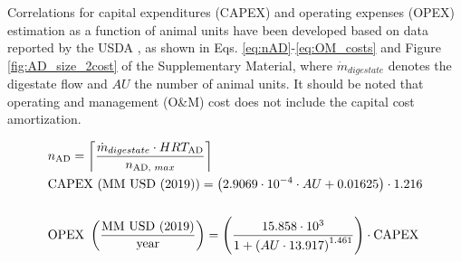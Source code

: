 \begin{refsection}[referencesCh6]
Correlations for capital expenditures (CAPEX) and operating expenses (OPEX) estimation as a function of animal units have been developed based on data reported by the USDA \citep{USDAOM}, as shown in Eqs. \ref{eq:nAD}-\ref{eq:OM_costs} and Figure \ref{fig:AD_size_2cost} of the Supplementary Material, where $\dot{m}_{digestate}$ denotes the digestate flow and $AU$ the number of animal units. It should be noted that operating and management (O\&M) cost does not include the capital cost amortization.


\begin{align} 
	& n_{\text{AD}} = \ceil*{\frac{\dot{m}_{digestate} \cdot HRT_{\text{AD}}}{n_{\text{AD, }max}}} \label{eq:nAD} \\
	& \text{CAPEX (MM USD (2019))} = \left(2.9069 \cdot 10^{-4} \cdot AU+0.01625\right) \cdot 1.216 \label{eq:inv_costs}\\ \nonumber\\
	& \text{OPEX } \left(\frac{\text{MM USD (2019)}}{\text{year}}\right) = \left(\frac{15.858\cdot 10^{3}}{1+\left(AU \cdot 13.917\right)^{1.461}}\right) \cdot \text{CAPEX} \label{eq:OM_costs}
\end{align}


\end{refsection}

